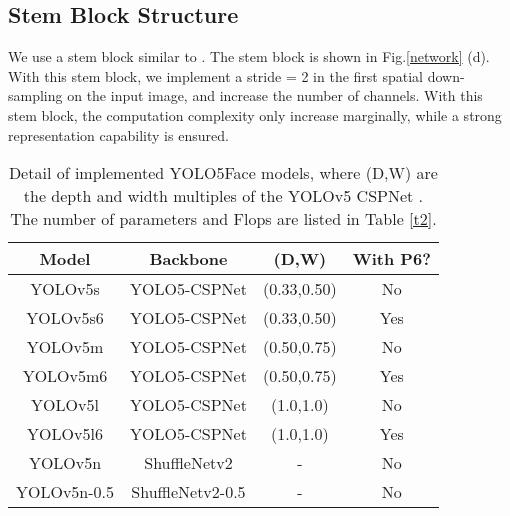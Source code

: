 \documentclass[conference]{IEEEtran}
\begin{document}
\subsection{Stem Block Structure}

We use a stem block similar to \cite{Stem}. The stem block is shown in Fig.\ref{network} (d). With this stem block, we implement a stride = 2  in the first spatial down-sampling on the input image, and increase the number of channels. With this stem block, the computation complexity only increase marginally, while a strong representation capability is ensured.  



\begin{table}[htb]
    \centering
    \begin{tabular}{c|c|c|c}
        \hline
        Model &  Backbone & (D,W) & With P6? \\
        \hline
        YOLOv5s	& YOLO5-CSPNet \cite{YOLOv5} & (0.33,0.50) & No \\
        YOLOv5s6	& YOLO5-CSPNet & (0.33,0.50) & Yes \\ 
        YOLOv5m	& YOLO5-CSPNet & (0.50,0.75) & No \\
        YOLOv5m6	& YOLO5-CSPNet & (0.50,0.75) & Yes \\
        YOLOv5l	& YOLO5-CSPNet & (1.0,1.0) & No \\
        YOLOv5l6	& YOLO5-CSPNet & (1.0,1.0) & Yes \\
        \hline
        YOLOv5n	& ShuffleNetv2 \cite{ShuffleNetv2} & - & No \\
        YOLOv5n-0.5	& ShuffleNetv2-0.5 \cite{ShuffleNetv2} & - & No \\ 	

        \hline
    \end{tabular}
    \caption{Detail of implemented YOLO5Face models, where (D,W) are the depth and width multiples of the YOLOv5 CSPNet \cite{YOLOv5}. The number of parameters and Flops are listed in Table \ref{t2}.}
    \label{t0}
\end{table}
\end{document}
